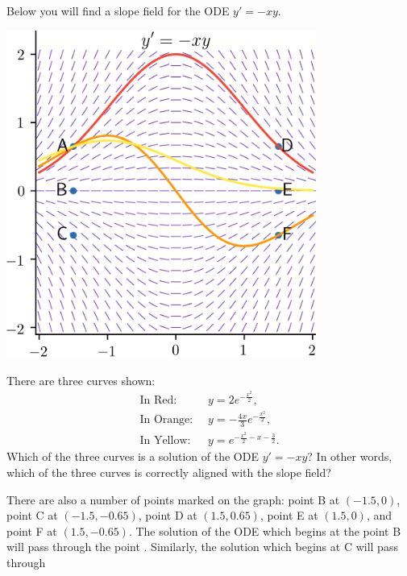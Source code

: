 \documentclass{ximera}
\begin{document}
\begin{example}
Below you will find a slope field for the ODE $y' = -xy$.
\begin{center}
\begin{image}
\includegraphics[width=4in]{images/slopeX01.png}
\end{image}
\end{center}
 There are three curves shown:
\[ \begin{aligned}
\text{In Red: } \ & {\displaystyle y = 2 e^{-\frac{x^2}{2}}}, \\
\text{In Orange: } \ & {\displaystyle y = -\frac{4x}{3} e^{-\frac{x^2}{2}}}, \\
\text{In Yellow: } \ & {\displaystyle y = e^{-\frac{x^2}{2} - x - \frac{3}{2}}}.
\end{aligned} \]
Which of the three curves is a solution of the ODE $y' = -xy$? In other words, which of the three curves is correctly aligned with the slope field?
\begin{multipleChoice}
\end{multipleChoice}
There are also a number of points marked on the graph: point B at $(-1.5,0)$, point C at $(-1.5,-0.65)$, point D at $(1.5,0.65)$, point E at $(1.5,0)$, and point F at $(1.5,-0.65)$. The solution of the ODE which begins at the point B will pass through the point . Similarly, the solution which begins at C will pass through 
\end{example}
\end{document}
